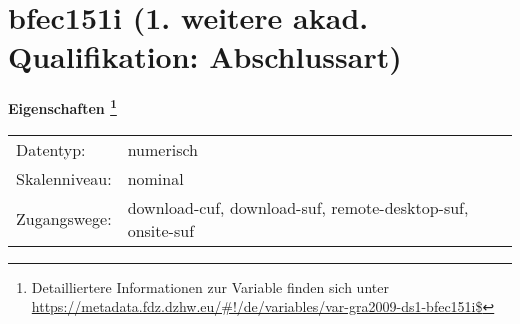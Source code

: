 
    \setcounter{footnote}{0}

    \vspace*{-1.8cm}
	\section{bfec151i (1. weitere akad. Qualifikation: Abschlussart)}
	\label{section:bfec151i}



    \vspace*{0.5cm}
    \noindent\textbf{Eigenschaften
	\footnote{Detailliertere Informationen zur Variable finden sich unter
		\url{https://metadata.fdz.dzhw.eu/\#!/de/variables/var-gra2009-ds1-bfec151i$}}}\\
	\begin{tabularx}{\hsize}{@{}lX}
	Datentyp: & numerisch \\
	Skalenniveau: & nominal \\
	Zugangswege: &
	  download-cuf, 
	  download-suf, 
	  remote-desktop-suf, 
	  onsite-suf
 \\
    \end{tabularx}



